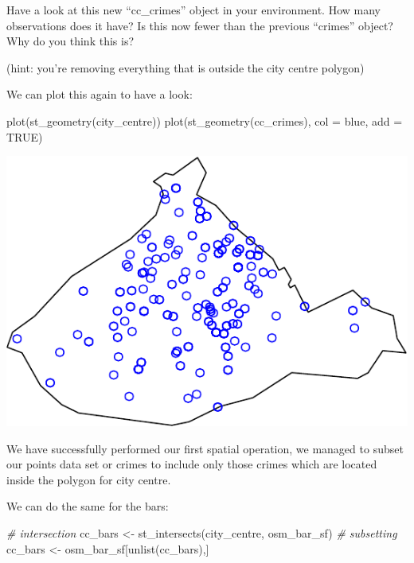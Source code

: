 \documentclass[
]{book}
\newenvironment{Shaded}{\begin{snugshade}}{\end{snugshade}}
\newcommand{\AttributeTok}[1]{\textcolor[rgb]{0.77,0.63,0.00}{#1}}
\newcommand{\CommentTok}[1]{\textcolor[rgb]{0.56,0.35,0.01}{\textit{#1}}}
\newcommand{\ConstantTok}[1]{\textcolor[rgb]{0.00,0.00,0.00}{#1}}
\newcommand{\FunctionTok}[1]{\textcolor[rgb]{0.00,0.00,0.00}{#1}}
\newcommand{\NormalTok}[1]{#1}
\newcommand{\OtherTok}[1]{\textcolor[rgb]{0.56,0.35,0.01}{#1}}
\newcommand{\StringTok}[1]{\textcolor[rgb]{0.31,0.60,0.02}{#1}}
\begin{document}
Have a look at this new ``cc\_crimes'' object in your environment. How many observations does it have? Is this now fewer than the previous ``crimes'' object? Why do you think this is?

(hint: you're removing everything that is outside the city centre polygon)

We can plot this again to have a look:

\begin{Shaded}
\begin{Highlighting}[]
\FunctionTok{plot}\NormalTok{(}\FunctionTok{st\_geometry}\NormalTok{(city\_centre))}
\FunctionTok{plot}\NormalTok{(}\FunctionTok{st\_geometry}\NormalTok{(cc\_crimes), }\AttributeTok{col =} \StringTok{\textquotesingle{}blue\textquotesingle{}}\NormalTok{,  }\AttributeTok{add =} \ConstantTok{TRUE}\NormalTok{)}
\end{Highlighting}
\end{Shaded}

\includegraphics{crime_mapping_files/figure-latex/plot_crimes_ccentre-1.pdf}

We have successfully performed our first spatial operation, we managed to subset our points data set or crimes to include only those crimes which are located inside the polygon for city centre.

We can do the same for the bars:

\begin{Shaded}
\begin{Highlighting}[]
\CommentTok{\# intersection}
\NormalTok{cc\_bars }\OtherTok{\textless{}{-}} \FunctionTok{st\_intersects}\NormalTok{(city\_centre, osm\_bar\_sf)}
\CommentTok{\# subsetting}
\NormalTok{cc\_bars }\OtherTok{\textless{}{-}}\NormalTok{ osm\_bar\_sf[}\FunctionTok{unlist}\NormalTok{(cc\_bars),]}
\end{Highlighting}
\end{Shaded}
\end{document}
